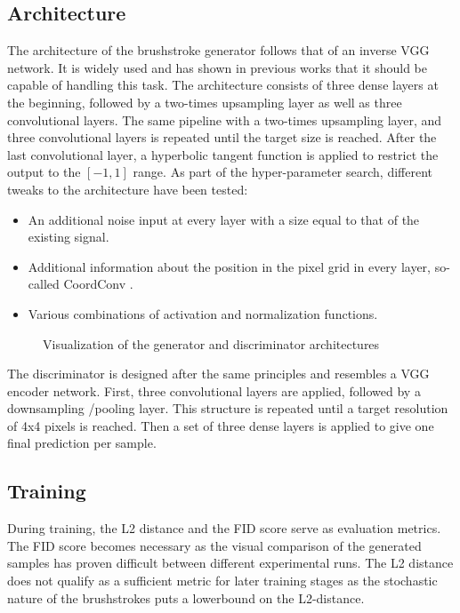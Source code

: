 \subsection{Architecture}
The architecture of the brushstroke generator follows that of an inverse VGG network.
It is widely used and has shown in previous works that it should be capable of handling this task.
 The architecture consists of three dense layers at the beginning, followed by a two-times upsampling layer as well as three convolutional layers.
The same pipeline with a two-times upsampling layer, and three convolutional layers is repeated until the target size is reached.
After the last convolutional layer, a hyperbolic tangent function is applied to restrict the output to the $[-1, 1]$ range.
As part of the hyper-parameter search, different tweaks to the architecture have been tested:
\begin{itemize}
    \item An additional noise input at every layer with a size equal to that of the existing signal.
    \item Additional information about the position in the pixel grid in every layer, so-called CoordConv \cite{coordconv}.
    \item Various combinations of activation and normalization functions.
\end{itemize}

\begin{figure}
    \resizebox{1.5\textwidth}{!}{
        
    }
    \resizebox{1.5\textwidth}{!}{
        
    }
        \caption{Visualization of the generator and discriminator architectures}
\end{figure}

The discriminator is designed after the same principles and resembles a VGG encoder network.
First, three convolutional layers are applied, followed by a downsampling /pooling layer.
This structure is repeated until a target resolution of 4x4 pixels is reached.
Then a set of three dense layers is applied to give one final prediction per sample.

\subsection{Training}
During training, the L2 distance and the FID score serve as evaluation metrics.
The FID score becomes necessary as the visual comparison of the generated samples has proven difficult between different experimental runs.
The L2 distance does not qualify as a sufficient metric for later training stages as the stochastic nature of the brushstrokes puts a lowerbound on the L2-distance.

